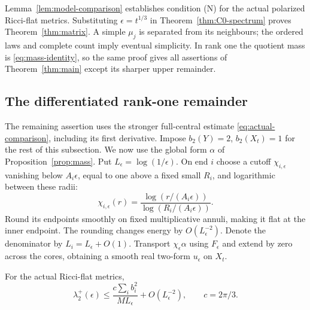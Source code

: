 Lemma~\ref{lem:model-comparison} establishes condition \textup{(N)} for
the actual polarized Ricci-flat metrics. Substituting
$\epsilon=t^{1/3}$ in Theorem~\ref{thm:C0-spectrum} proves
Theorem~\ref{thm:matrix}. A simple $\mu_j$ is separated from its neighbours;
the ordered laws and complete count imply eventual simplicity. In rank
one the quotient mass is \eqref{eq:mass-identity}, so the same proof gives
all assertions of Theorem~\ref{thm:main} except its sharper upper remainder.

\subsection{The differentiated rank-one remainder}
The remaining assertion uses the stronger full-central estimate
\eqref{eq:actual-comparison}, including its first derivative. Impose
$b_2(Y)=2$, $b_2(X_t)=1$ for the rest of this subsection.
We now use the global form $\alpha$ of Proposition~\ref{prop:mass}.
Put $L_\epsilon=\log(1/\epsilon)$. On end $i$ choose a cutoff
$\chi_{i,\epsilon}$ vanishing below $A_i\epsilon$, equal to one
above a fixed small $R_i$, and logarithmic between these radii:
\[
 \chi_{i,\epsilon}(r)=
 \frac{\log(r/(A_i\epsilon))}{\log(R_i/(A_i\epsilon))}.
\]
Round its endpoints smoothly on fixed multiplicative annuli, making
it flat at the inner endpoint. The rounding changes energy by
$O(L_\epsilon^{-2})$. Denote the denominator by
$L_i=L_\epsilon+O(1)$. Transport $\chi_\epsilon\alpha$ using
$F_\epsilon$ and extend by zero across the cores, obtaining a smooth
real two-form $u_\epsilon$ on $X_t$.

\begin{proposition}\label{prop:upper}
For the actual Ricci-flat metrics,
\begin{equation}\label{eq:epsilon-upper}
 \lambda_2^+(\epsilon)
 \le\frac{c\sum_i b_i^2}{M L_\epsilon}+O(L_\epsilon^{-2}),
 \qquad c=2\pi/3.
\end{equation}
\end{proposition}

